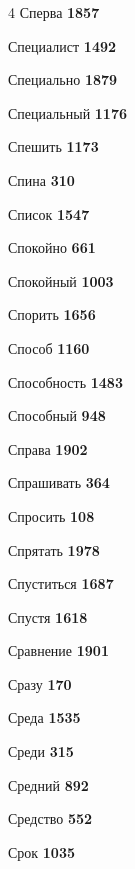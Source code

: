 \begin{multicols}{4}
\noindent Сперва \dotfill \textbf{\color{secondary} 1857}\par
\noindent Специалист \dotfill \textbf{\color{secondary} 1492}\par
\noindent Специально \dotfill \textbf{\color{secondary} 1879}\par
\noindent Специальный \dotfill \textbf{\color{secondary} 1176}\par
\noindent Спешить \dotfill \textbf{\color{secondary} 1173}\par
\noindent Спина \dotfill \textbf{\color{secondary} 310}\par
\noindent Список \dotfill \textbf{\color{secondary} 1547}\par
\noindent Спокойно \dotfill \textbf{\color{secondary} 661}\par
\noindent Спокойный \dotfill \textbf{\color{secondary} 1003}\par
\noindent Спорить \dotfill \textbf{\color{secondary} 1656}\par
\noindent Способ \dotfill \textbf{\color{secondary} 1160}\par
\noindent Способность \dotfill \textbf{\color{secondary} 1483}\par
\noindent Способный \dotfill \textbf{\color{secondary} 948}\par
\noindent Справа \dotfill \textbf{\color{secondary} 1902}\par
\noindent Спрашивать \dotfill \textbf{\color{secondary} 364}\par
\noindent Спросить \dotfill \textbf{\color{secondary} 108}\par
\noindent Спрятать \dotfill \textbf{\color{secondary} 1978}\par
\noindent Спуститься \dotfill \textbf{\color{secondary} 1687}\par
\noindent Спустя \dotfill \textbf{\color{secondary} 1618}\par
\noindent Сравнение \dotfill \textbf{\color{secondary} 1901}\par
\noindent Сразу \dotfill \textbf{\color{secondary} 170}\par
\noindent Среда \dotfill \textbf{\color{secondary} 1535}\par
\noindent Среди \dotfill \textbf{\color{secondary} 315}\par
\noindent Средний \dotfill \textbf{\color{secondary} 892}\par
\noindent Средство \dotfill \textbf{\color{secondary} 552}\par
\noindent Срок \dotfill \textbf{\color{secondary} 1035}\par

\end{multicols}
